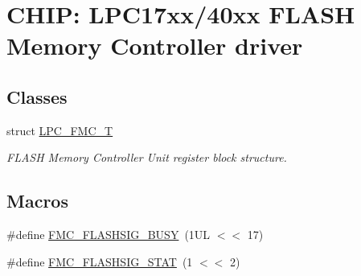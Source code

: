 \hypertarget{group__FMC__17XX__40XX}{}\section{C\+H\+IP\+: L\+P\+C17xx/40xx F\+L\+A\+SH Memory Controller driver}
\label{group__FMC__17XX__40XX}
\subsection*{Classes}
\begin{DoxyCompactItemize}
\item 
struct \hyperlink{structLPC__FMC__T}{L\+P\+C\+\_\+\+F\+M\+C\+\_\+T}
\begin{DoxyCompactList}\small\item\em F\+L\+A\+SH Memory Controller Unit register block structure. \end{DoxyCompactList}\end{DoxyCompactItemize}
\subsection*{Macros}
\begin{DoxyCompactItemize}
\item 
\#define \hyperlink{group__FMC__17XX__40XX_ga1c732efb3127d9e699c46b4a89706639}{F\+M\+C\+\_\+\+F\+L\+A\+S\+H\+S\+I\+G\+\_\+\+B\+U\+SY}~(1\+U\+L $<$$<$ 17)
\item 
\#define \hyperlink{group__FMC__17XX__40XX_ga3d2c7a30422c68c08d48b4e4f03a2787}{F\+M\+C\+\_\+\+F\+L\+A\+S\+H\+S\+I\+G\+\_\+\+S\+T\+AT}~(1 $<$$<$ 2)
\end{DoxyCompactItemize}
